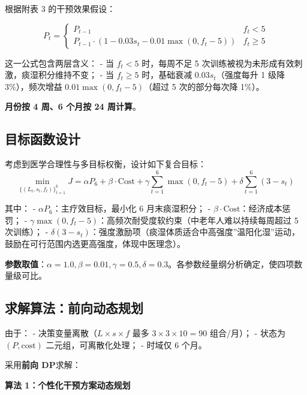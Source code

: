 \documentclass{MathorCupmodeling}
\begin{document}
根据附表 3 的干预效果假设：

\[P_t = \begin{cases}P_{t-1} & f_t < 5 \\ P_{t-1} \cdot \left(1 - 0.03 s_t - 0.01 \max(0, f_t - 5)\right) & f_t \ge 5\end{cases}\]

这一公式包含两层含义： - 当 \(f_t < 5\) 时，每周不足 5 次训练被视为未形成有效刺激，痰湿积分维持不变； - 当 \(f_t \ge 5\) 时，基础衰减 \(0.03 s_t\)（强度每升 1 级降 3\%），频次增益 \(0.01 \max(0, f_t - 5)\)（超过 5 次的部分每次降 1\%）。

\textbf{月份按 4 周、6 个月按 24 周计算}。

\subsection{目标函数设计}\label{ux76eeux6807ux51fdux6570ux8bbeux8ba1}

考虑到医学合理性与多目标权衡，设计如下复合目标： \[\min_{\{(L_t, s_t, f_t)\}_{t=1}^{6}} J = \alpha P_6 + \beta \cdot \text{Cost} + \gamma \sum_{t=1}^{6} \max(0, f_t - 5) + \delta \sum_{t=1}^{6}(3 - s_t)\]

其中： - \textbf{\(\alpha P_6\)}：主疗效目标，最小化 6 月末痰湿积分； - \textbf{\(\beta \cdot \text{Cost}\)}：经济成本惩罚； - \textbf{\(\gamma \max(0, f_t - 5)\)}：高频次耐受度软约束（中老年人难以持续每周超过 5 次训练）； - \textbf{\(\delta(3 - s_t)\)}：强度激励项（痰湿体质适合中高强度''温阳化湿''运动，鼓励在可行范围内选更高强度，体现中医理念）。

\textbf{参数取值}：\(\alpha = 1.0, \beta = 0.01, \gamma = 0.5, \delta = 0.3\)。各参数经量纲分析确定，使四项数量级可比。

\subsection{求解算法：前向动态规划}\label{ux6c42ux89e3ux7b97ux6cd5ux524dux5411ux52a8ux6001ux89c4ux5212}

由于： - 决策变量离散（\(L \times s \times f\) 最多 \(3 \times 3 \times 10 = 90\) 组合/月）； - 状态为 \((P, \text{cost})\) 二元组，可离散化处理； - 时域仅 6 个月。

采用\textbf{前向 DP}求解：

\textbf{算法 1：个性化干预方案动态规划}
\end{document}
